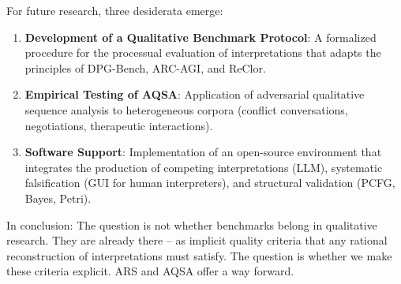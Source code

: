 \documentclass[12pt,a4paper]{article}
\begin{document}
For future research, three desiderata emerge:

\begin{enumerate}
    \item \textbf{Development of a Qualitative Benchmark Protocol}: A formalized procedure for the processual evaluation of interpretations that adapts the principles of DPG-Bench, ARC-AGI, and ReClor.
    
    \item \textbf{Empirical Testing of AQSA}: Application of adversarial qualitative sequence analysis to heterogeneous corpora (conflict conversations, negotiations, therapeutic interactions).
    
    \item \textbf{Software Support}: Implementation of an open-source environment that integrates the production of competing interpretations (LLM), systematic falsification (GUI for human interpreters), and structural validation (PCFG, Bayes, Petri).
\end{enumerate}

In conclusion: The question is not whether benchmarks belong in qualitative research. They are already there – as implicit quality criteria that any rational reconstruction of interpretations must satisfy. The question is whether we make these criteria explicit. ARS and AQSA offer a way forward.
\end{document}

